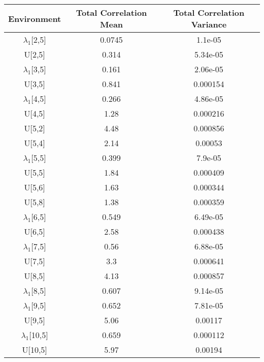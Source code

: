 \begin{table}[ht!]
\centering
\begin{tabular}{|c|c|c|}
\hline
Environment & Total Correlation Mean& Total Correlation Variance\\
\hline
\hline
$\lambda_{1}$[2,5] &0.0745&1.1e-05\\
U[2,5] &0.314&5.34e-05\\
$\lambda_{1}$[3,5] &0.161&2.06e-05\\
U[3,5] &0.841&0.000154\\
$\lambda_{1}$[4,5] &0.266&4.86e-05\\
U[4,5] &1.28&0.000216\\
U[5,2] &4.48&0.000856\\
U[5,4] &2.14&0.00053\\
$\lambda_{1}$[5,5] &0.399&7.9e-05\\
U[5,5] &1.84&0.000409\\
U[5,6] &1.63&0.000344\\
U[5,8] &1.38&0.000359\\
$\lambda_{1}$[6,5] &0.549&6.49e-05\\
U[6,5] &2.58&0.000438\\
$\lambda_{1}$[7,5] &0.56&6.88e-05\\
U[7,5] &3.3&0.000641\\
U[8,5] &4.13&0.000857\\
$\lambda_{1}$[8,5] &0.607&9.14e-05\\
$\lambda_{1}$[9,5] &0.652&7.81e-05\\
U[9,5] &5.06&0.00117\\
$\lambda_{1}$[10,5] &0.659&0.000112\\
U[10,5] &5.97&0.00194\\
\hline
\end{tabular}
\end{table}
